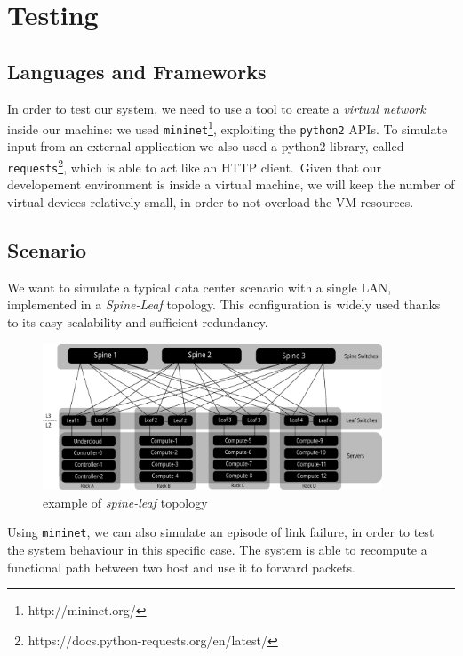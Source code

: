 \chapter{Testing}
\section*{Languages and Frameworks}
In order to test our system, we need to use a tool to create a \textit{virtual network} inside our machine: we used \texttt{mininet}\footnote{http://mininet.org/}, 
exploiting the \texttt{python2} APIs. To simulate input from an external application we also used a python2 library, called \texttt{requests}\footnote{https://docs.python-requests.org/en/latest/},
which is able to act like an HTTP client.\
Given that our developement environment is inside a virtual machine, we will keep the number of virtual devices relatively small, in order to not
overload the VM resources.

\section*{Scenario}
We want to simulate a typical data center scenario with a single LAN, implemented in a \textit{Spine-Leaf} topology. This configuration
is widely used thanks to its easy scalability and sufficient redundancy.
\begin{figure}[h]
    \centering
    \caption{example of \textit{spine-leaf} topology}
    \includegraphics[width=0.90\textwidth]{img/spine_leaf.pdf}
\end{figure}

Using \texttt{mininet}, we can also simulate an episode of link failure, in order to test the system behaviour in this specific case. The system is able to recompute a functional path between two host and use it to forward packets.
\newpage
